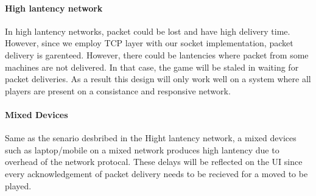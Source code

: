 \paragraph*{High lantency network}

In high lantency networks, packet could be lost and have high delivery time. However, since we employ TCP layer with our socket implementation, packet delivery is garenteed. However, there could be lantencies where packet from some machines are not delivered. In that case, the game will be staled in waiting for packet deliveries. As a result this design will only work well on a system where all players are present on a consistance and responsive network.

\paragraph*{Mixed Devices}

Same as the senario desbribed in the Hight lantency network, a mixed devices such as laptop/mobile on a mixed network produces high lantency due to overhead of the network protocal. These delays will be reflected on the UI since every acknowledgement of packet delivery needs to be recieved for a moved to be played.
